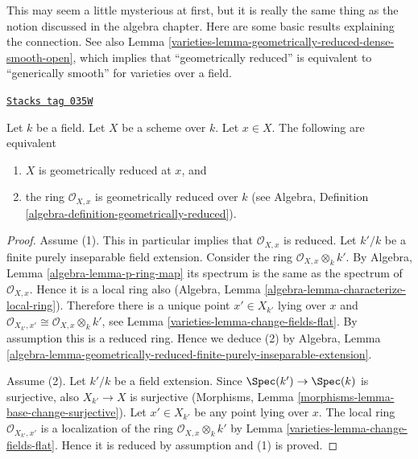 This may seem a little mysterious at first, but it is
really the same thing as the notion discussed in the algebra chapter.
Here are some basic results explaining the connection.
See also Lemma \ref{varieties-lemma-geometrically-reduced-dense-smooth-open},
which implies that ``geometrically reduced'' is equivalent
to ``generically smooth'' for varieties over a field.

\begin{lemma}
\label{varieties-lemma-geometrically-reduced-at-point}
\href{https://stacks.math.columbia.edu/tag/035W}{\texttt{Stacks tag 035W}}


Let $k$ be a field.
Let $X$ be a scheme over $k$.
Let $x \in X$.
The following are equivalent
\begin{enumerate}
\item $X$ is geometrically reduced at $x$, and
\item the ring $\mathcal{O}_{X, x}$ is geometrically
reduced over $k$ (see
Algebra, Definition \ref{algebra-definition-geometrically-reduced}).
\end{enumerate}
\end{lemma}

\begin{proof}

Assume (1). This in particular implies that $\mathcal{O}_{X, x}$
is reduced. Let $k'/k$ be a finite purely inseparable field
extension. Consider the ring $\mathcal{O}_{X, x} \otimes_k k'$.
By Algebra, Lemma \ref{algebra-lemma-p-ring-map}
its spectrum is the same as the spectrum of $\mathcal{O}_{X, x}$.
Hence it is a local ring also
(Algebra, Lemma \ref{algebra-lemma-characterize-local-ring}).
Therefore there is a unique point $x' \in X_{k'}$ lying over $x$
and $\mathcal{O}_{X_{k'}, x'} \cong \mathcal{O}_{X, x} \otimes_k k'$,
see Lemma \ref{varieties-lemma-change-fields-flat}.
By assumption this is a reduced ring. Hence we deduce (2) by
Algebra, Lemma
\ref{algebra-lemma-geometrically-reduced-finite-purely-inseparable-extension}.

\medskip\noindent
Assume (2). Let $k'/k$ be a field extension. Since
$\Spec(k') \to \Spec(k)$ is surjective, also
$X_{k'} \to X$ is surjective
(Morphisms, Lemma \ref{morphisms-lemma-base-change-surjective}).
Let $x' \in X_{k'}$ be any point lying over $x$.
The local ring $\mathcal{O}_{X_{k'}, x'}$
is a localization of the ring $\mathcal{O}_{X, x} \otimes_k k'$
by Lemma \ref{varieties-lemma-change-fields-flat}.
Hence it is reduced by assumption and (1) is proved.
\end{proof}

